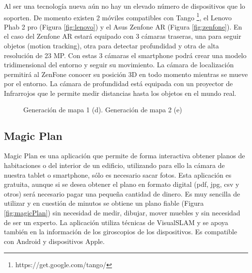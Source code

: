 Al ser una tecnología nueva aún no hay un elevado número de dispositivos que lo soporten. De momento existen 2 móviles compatibles con Tango \footnote{https://get.google.com/tango/}, el Lenovo  Phab 2 pro (Figura \ref{fig:lenovo}) y el Asus Zenfone AR (Figura \ref{fig:zenfone}).
En el caso del Zenfone AR  estará equipado con 3 cámaras traseras, una para seguir objetos (motion tracking), otra para detectar profundidad y otra de alta resolución de 23 MP.
Con estas 3 cámaras el smartphone podrá crear una modelo tridimensional del entorno y seguir su movimiento. La cámara de localización permitirá al ZenFone conocer su posición 3D en todo momento mientras se mueve por el entorno. La cámara de profundidad está equipada con un proyector de Infrarrojos que le permite medir distancias hasta los objetos en el mundo real.

\begin{figure}[htbp]
\begin{center}
\hspace{0.5cm}
\end{center}
\caption{Generación de mapa 1 (d). Generación de mapa 2 (e)}
\end{figure}

\clearpage

\subsection{Magic Plan}
Magic Plan es una aplicación que permite de forma interactiva obtener planos de habitaciones o del interior de un edificio, utilizando para ello la cámara de nuestra tablet o smartphone, sólo es necesario sacar fotos. Esta aplicación es gratuita, aunque si se desea obtener el plano en formato digital (pdf, jpg, csv y otros) será necesario pagar una pequeña cantidad de dinero.
Es muy sencilla de utilizar y en cuestión de minutos se obtiene un plano fiable (Figura \ref{fig:magicPlan}) sin necesidad de medir, dibujar, mover muebles  y sin necesidad de ser un experto.
La aplicación utiliza técnicas de VisualSLAM y se apoya también en la información de los giroscopios de los dispositivos. Es compatible con Android y dispositivos Apple.

